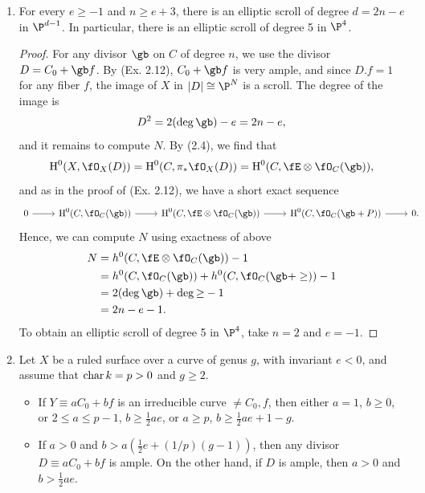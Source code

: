 \documentclass[a4paper]{article}
\begin{document}
\begin{enumerate} [label=\textbf{\arabic*.}, leftmargin=0em]
    \item For every $e \geq -1$ and $n \geq e + 3$, there is an elliptic scroll of degree $d = 2n - e$ in $\P^{d - 1}$.
          In particular, there is an elliptic scroll of degree 5 in $\P^4$.

          \begin{proof}
              For any divisor $\gb$ on $C$ of degree $n$, we use the divisor $D = C_0 + \gb f$.
              By (Ex. 2.12), $C_0 + \gb f$ is very ample, and since $D.f = 1$ for any fiber $f$, the image of $X$ in $|D| \cong \P^N$ is a scroll.
              The degree of the image is
              \begin{equation*}
                  D^2 = 2(\deg{\gb}) - e = 2n - e,
              \end{equation*}
              and it remains to compute $N$.
              By (2.4), we find that
              \begin{equation*}
                  \cH^0(X, \fO_X(D)) = \cH^0(C, \pi_*\fO_X(D)) = \cH^0(C, \fE \otimes \fO_C(\gb)),
              \end{equation*}
              and as in the proof of (Ex. 2.12), we have a short exact sequence
              \[ \begin{tikzcd}
                      0 \arrow[r] & \cH^0(C, \fO_C(\gb)) \arrow[r] & \cH^0(C, \fE \otimes \fO_C(\gb)) \arrow[r] & \cH^0(C, \fO_C(\gb + P)) \arrow[r] & 0.
                  \end{tikzcd} \]
              Hence, we can compute $N$ using exactness of above
              \begin{align*}
                  N & = h^0(C, \fE \otimes \fO_C(\gb)) - 1                \\
                    & = h^0(C, \fO_C(\gb)) + h^0(C, \fO_C(\gb + \ge)) - 1 \\
                    & = 2(\deg \gb) + \deg{\ge} - 1                       \\
                    & = 2n - e - 1.
              \end{align*}
              To obtain an elliptic scroll of degree 5 in $\P^4$, take $n = 2$ and $e = -1$.
          \end{proof}

    \item Let $X$ be a ruled surface over a curve of genus $g$, with invariant $e < 0$, and assume that $\operatorname{char}{k} = p > 0$ and $g \geq 2$.
          \begin{itemize}
              \item[(a)] If $Y \equiv aC_0 + bf$ is an irreducible curve $\neq C_0, f$, then either $a = 1$, $b \geq 0$, or $2 \leq a \leq p - 1$, $b \geq \frac{1}{2}ae$, or $a \geq p$, $b \geq \frac{1}{2} ae + 1 - g$.
              \item[(b)] If $a > 0$ and $b > a(\frac{1}{2}e + (1/p)(g - 1))$, then any divisor $D \equiv aC_0 + bf$ is ample.
                    On the other hand, if $D$ is ample, then $a > 0$ and $b > \frac{1}{2}ae$.
          \end{itemize}


\end{enumerate}
\end{document}
